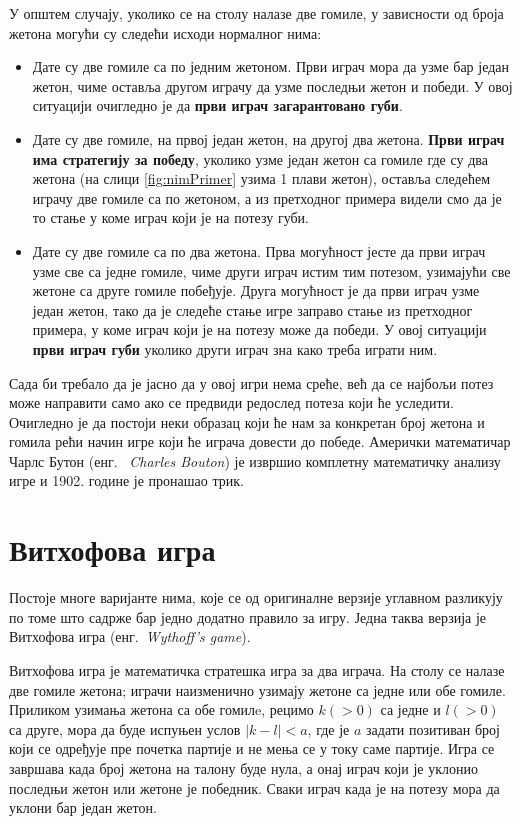\documentclass[a4paper]{article}
\begin{document}
У општем случају, уколико се на столу налазе две гомиле, у зависности од броја жетона могући су следећи исходи нормалног нима:

\begin{itemize}
	\item Дате су две гомиле са по једним жетоном. Први играч мора да узме бар један жетон, чиме оставља другом играчу да узме последњи жетон и победи. У овој ситуацији очигледно је да \textbf{први играч загарантовано губи}.
	
	\item Дате су две гомиле, на првој један жетон, на другој два жетона. \textbf{Први играч има стратегију за победу}, уколико узме један жетон са гомиле где су два жетона (на слици \ref{fig:nimPrimer} узима 1 плави жетон), оставља следећем играчу две гомиле са по жетоном, а из претходног примера видели смо да је то стање у коме играч који је на потезу губи.
	
	\item Дате су две гомиле са по два жетона. Прва могућност јесте да први играч узме све са једне гомиле, чиме други играч истим тим потезом, узимајући све жетоне са друге гомиле побеђује. Друга могућност је да први играч узме један жетон, тако да је следеће стање игре заправо стање из претходног примера, у коме играч који је на потезу може да победи. У овој ситуацији \textbf{први играч губи} уколико други играч зна како треба играти ним.
\end{itemize}

Сада би требало да је јасно да у овој игри нема среће, већ да се најбољи потез може направити само ако се предвиди редослед потеза који ће уследити. Очигледно је да постоји неки образац који ће нам за конкретан број жетона и гомила рећи начин игре који ће играча довести до победе. Амерички математичар Чарлс Бутон (енг. {~\em Charles Bouton}) је извршио комплетну математичку анализу игре и 1902. године је пронашао трик. \cite{10.2307/1967631}

\section{Витхофова игра}
\label{sec:vithofova_igra}

Постоје многе варијанте нима, које се од оригиналне верзије углавном разликују по томе што садрже бар једно додатно правило за игру. Једна таква верзија је Витхофова игра (енг.{~\em Wythoff's game})\cite{10.2307/2321643}.

Витхофова игра је математичка стратешка игра за два играча. На столу се налазе две гомиле жетона; играчи наизменично узимају жетоне са једне или обе гомиле. Приликом узимања жетона са обе гомилe, рецимо $ k (> 0) $ са једне и $ l (> 0) $ са друге, мора да буде испуњен услов $ |k - l| < a $, где је $ a $ задати позитиван број који се одређује пре почетка партије и не мења се у току саме партије. Игра се завршава када број жетона на талону буде нула, а онај играч који је уклонио последњи жетон или жетоне је победник. Сваки играч када је на потезу мора да уклони бар један жетон.
\end{document}
